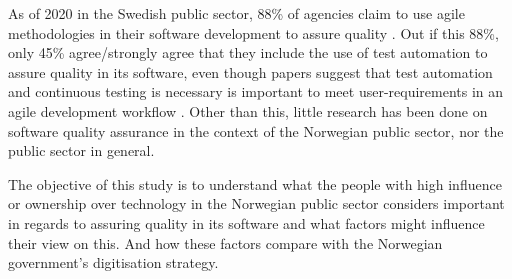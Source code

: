 As of 2020 in the Swedish public sector, 88\% of agencies claim to use agile methodologies in their software development to assure quality \cite{mb_2020}. Out if this 88\%, only 45\% agree/strongly agree that they include the use of test automation to assure quality in its software, even though papers suggest that test automation and continuous testing is necessary is important to meet user-requirements in an agile development workflow \cite{vk_2010}. Other than this, little research has been done on software quality assurance in the context of the Norwegian public sector, nor the public sector in general. 




The objective of this study is to understand what the people with high influence or ownership over technology in the Norwegian public sector considers important in regards to assuring quality in its software and what factors might influence their view on this. And how these factors compare with the Norwegian government's digitisation strategy.
 
